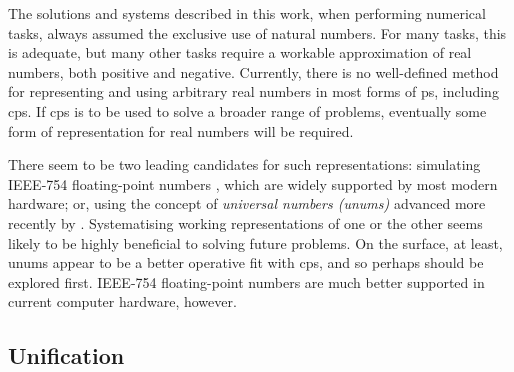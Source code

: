 The solutions and systems described in this work, when performing numerical tasks, always assumed the exclusive use of natural numbers.  For many tasks, this is adequate, but many other tasks require a workable approximation of real numbers, both positive and negative.  Currently, there is no well-defined method for representing and using arbitrary real numbers in most forms of \gls{ps}, including \gls{cps}.  If \gls{cps} is to be used to solve a broader range of problems, eventually some form of representation for real numbers will be required.

There seem to be two leading candidates for such representations:  simulating IEEE-754 floating-point numbers \cite{ieee754}, which are widely supported by most modern hardware;  or, using the concept of \emph{universal numbers (unums)} advanced more recently by \citeauthor{Gustafson2017} \cite{Gustafson2017}.  Systematising working representations of one or the other seems likely to be highly beneficial to solving future problems.  On the surface, at least, unums appear to be a better operative fit with \gls{cps}, and so perhaps should be explored first.  IEEE-754 floating-point numbers are much better supported in current computer hardware, however.


\subsection{Unification}


